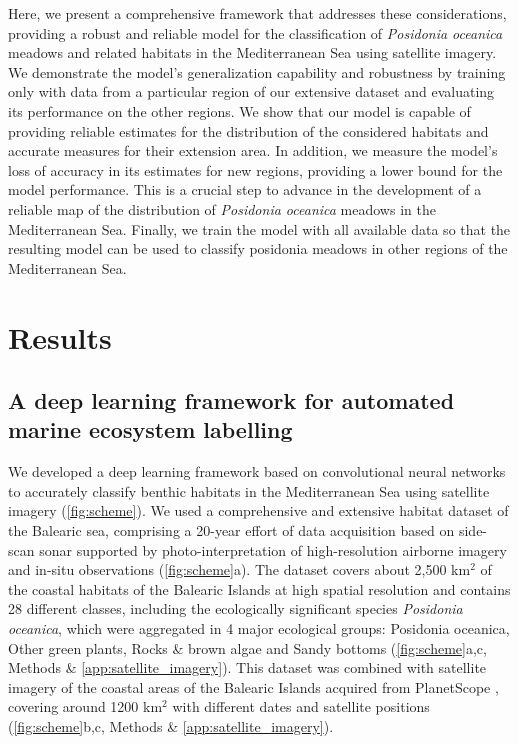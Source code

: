 Here, we present a comprehensive framework that addresses these considerations,
providing a robust and reliable model for the classification of
\textit{Posidonia
    oceanica} meadows and related habitats in the Mediterranean Sea using
satellite imagery. We demonstrate the model's generalization capability and
robustness by training only with data from a particular region of our extensive
dataset and evaluating its performance on the other regions. We show that our
model is capable of providing reliable estimates for the distribution of the
considered habitats and accurate measures for their extension area. In
addition, we measure the model's loss of accuracy in its estimates for new
regions, providing a lower bound for the model performance. This is a
crucial step to advance in the development of a reliable map of the
distribution of \textit{Posidonia oceanica} meadows in the Mediterranean Sea.
Finally, we train the model with all available data so that the resulting
model can be used to classify posidonia meadows in other regions of the
Mediterranean Sea.

\section{Results}

\subsection{A deep learning framework for automated marine ecosystem
    labelling}

We developed a deep learning framework based on convolutional neural networks
to accurately classify benthic habitats in the Mediterranean Sea using
satellite imagery (\cref{fig:scheme}). We used a comprehensive and extensive
habitat dataset of the Balearic sea, comprising a 20-year effort of data
acquisition based on side-scan sonar supported by photo-interpretation of
high-resolution airborne imagery and in-situ observations (\cref{fig:scheme}a).
The dataset covers  about 2,500 km$^2$ of the coastal habitats of the Balearic
Islands at high spatial resolution and contains 28 different classes,
including the ecologically significant species \textit{Posidonia
    oceanica}, which were
aggregated in 4 major ecological groups: Posidonia oceanica, Other
green plants, Rocks \& brown algae and Sandy bottoms
(\cref{fig:scheme}a,c, Methods \&  \cref{app:satellite_imagery}). This
dataset was
combined with satellite imagery of the coastal areas of the Balearic Islands
acquired from PlanetScope \cite{planet2017}, covering around 1200 km$^2$ with
different dates and
satellite positions (\cref{fig:scheme}b,c, Methods \&
\cref{app:satellite_imagery}).

